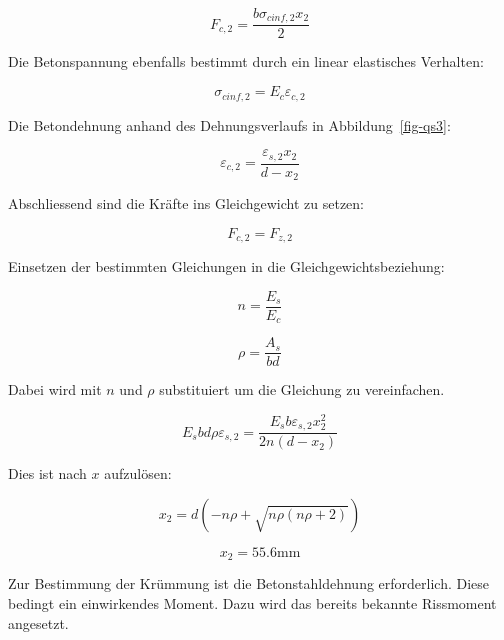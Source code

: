 \documentclass[
  12pt,
  letterpaper,
  egregdoesnotlikesansseriftitles]{scrreprt}
\begin{document}
\begin{equation}F_{c,2} = \frac{b \sigma_{c inf,2} x_{2}}{2}\end{equation}

Die Betonspannung ebenfalls bestimmt durch ein linear elastisches
Verhalten:

\begin{equation}\sigma_{c inf,2} = E_{c} \varepsilon_{c,2}\end{equation}

Die Betondehnung anhand des Dehnungsverlaufs in Abbildung~\ref{fig-qs3}:

\begin{equation}\varepsilon_{c,2} = \frac{\varepsilon_{s,2} x_{2}}{d - x_{2}}\end{equation}

Abschliessend sind die Kräfte ins Gleichgewicht zu setzen:

\begin{equation}F_{c,2} = F_{z,2}\end{equation}

Einsetzen der bestimmten Gleichungen in die Gleichgewichtsbeziehung:

\begin{equation}n = \frac{E_{s}}{E_{c}}\end{equation}

\begin{equation}\rho = \frac{A_{s}}{b d}\end{equation}

Dabei wird mit \(n\) und \(\rho\) substituiert um die Gleichung zu
vereinfachen.

\begin{equation}E_{s} b d \rho \varepsilon_{s,2} = \frac{E_{s} b \varepsilon_{s,2} x_{2}^{2}}{2 n \left(d - x_{2}\right)}\end{equation}

Dies ist nach \(x\) aufzulösen:

\begin{equation}x_{2} = d \left(- n \rho + \sqrt{n \rho \left(n \rho + 2\right)}\right)\end{equation}

\begin{equation}x_{2} = 55.6 \text{mm}\end{equation}

Zur Bestimmung der Krümmung ist die Betonstahldehnung erforderlich.
Diese bedingt ein einwirkendes Moment. Dazu wird das bereits bekannte
Rissmoment angesetzt.
\end{document}
